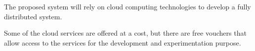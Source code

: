 The proposed system will rely on cloud computing technologies to develop a fully distributed system.

Some of the cloud services are offered at a cost, but there are free vouchers that allow access to the services for the development and experimentation purpose.
